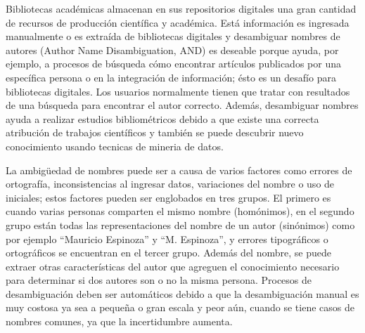 \documentclass[conference]{IEEEtran}
\begin{document}
Bibliotecas académicas almacenan en sus repositorios digitales una gran cantidad de recursos de producción científica y académica. Está información es ingresada manualmente o es extraída de bibliotecas digitales y desambiguar nombres de autores (Author Name Disambiguation, AND) es deseable porque ayuda, por ejemplo, a procesos de búsqueda cómo encontrar artículos publicados por una específica persona o en la integración de información; ésto es un desafío para bibliotecas digitales. Los usuarios normalmente tienen que tratar con resultados de una búsqueda para encontrar el autor correcto. Además, desambiguar nombres ayuda a realizar estudios bibliométricos debido a que existe una correcta atribución de trabajos científicos y también se puede descubrir nuevo conocimiento usando tecnicas de mineria de datos. 

La ambigüedad de nombres puede ser a causa de varios factores como errores de ortografía, inconsistencias al ingresar datos, variaciones del nombre o uso de iniciales; estos factores pueden ser englobados en tres grupos. El primero es cuando varias personas comparten el mismo nombre (homónimos), en el segundo grupo están todas las representaciones del nombre de un autor (sinónimos) como por ejemplo ``Mauricio Espinoza'' y ``M. Espinoza'', y errores tipográficos o ortográficos se encuentran en el tercer grupo. Además del nombre, se puede extraer  otras características del autor que agreguen el conocimiento necesario para determinar si dos autores son o no la misma persona. Procesos de desambiguación deben ser automáticos debido a que la desambiguación manual es muy costosa ya sea a pequeña o gran escala y  peor aún, cuando se tiene casos de nombres comunes, ya que la incertidumbre aumenta. 
\end{document}
